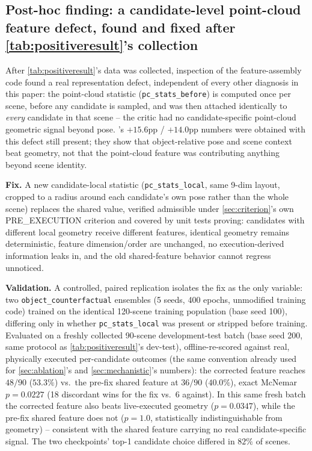 \documentclass[journal]{IEEEtran}
\begin{document}
\subsection{Post-hoc finding: a candidate-level point-cloud feature defect,
found and fixed after \cref{tab:positiveresult}'s collection}
\label{sec:pcfix}

After \cref{tab:positiveresult}'s data was collected, inspection of the
feature-assembly code found a real representation defect, independent of
every other diagnosis in this paper: the point-cloud statistic
(\texttt{pc\_stats\_before}) is computed once per scene, before any
candidate is sampled, and was then attached identically to \emph{every}
candidate in that scene -- the critic had no candidate-specific point-cloud
geometric signal beyond pose. 's $+15.6$pp /
$+14.0$pp numbers were obtained with this defect still present; they show
that object-relative pose and scene context beat geometry, not that the
point-cloud feature was contributing anything beyond scene identity.

\textbf{Fix.} A new candidate-local statistic
(\texttt{pc\_stats\_local}, same 9-dim layout, cropped to a radius around
each candidate's own pose rather than the whole scene) replaces the shared
value, verified admissible under \cref{sec:criterion}'s own
PRE\_EXECUTION criterion and covered by unit tests proving: candidates with
different local geometry receive different features, identical geometry
remains deterministic, feature dimension/order are unchanged, no
execution-derived information leaks in, and the old shared-feature behavior
cannot regress unnoticed.

\textbf{Validation.} A controlled, paired replication isolates the fix as
the only variable: two \texttt{object\_counterfactual} ensembles (5 seeds,
400 epochs, unmodified training code) trained on the identical 120-scene
training population (base seed 100), differing only in whether
\texttt{pc\_stats\_local} was present or stripped before training. Evaluated
on a freshly collected 90-scene development-test batch (base seed 200,
same protocol as \cref{tab:positiveresult}'s dev-test), offline-re-scored
against real, physically executed per-candidate outcomes (the same
convention already used for \cref{sec:ablation}'s and
\cref{sec:mechanistic}'s numbers): the corrected feature reaches
$48/90$ ($53.3\%$) vs.\ the pre-fix shared feature at $36/90$ ($40.0\%$),
exact McNemar $p{=}0.0227$ (18 discordant wins for the fix vs.\ 6 against).
In this same fresh batch the corrected feature also beats live-executed
geometry ($p{=}0.0347$), while the pre-fix shared feature does not
($p{=}1.0$, statistically indistinguishable from geometry) -- consistent
with the shared feature carrying no real candidate-specific signal. The
two checkpoints' top-1 candidate choice differed in $82\%$ of scenes.
\end{document}
